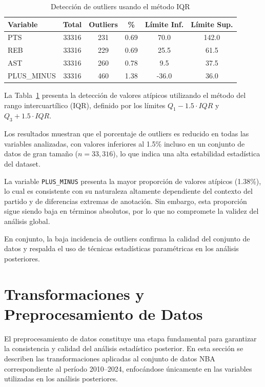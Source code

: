 \documentclass[12pt]{article}
\begin{document}
\begin{table}[H]
\centering
\caption{Detección de outliers usando el método IQR}
\label{tab:outliers_iqr}
\begin{tabular}{lccccc}
\toprule
Variable & Total & Outliers & \% & Límite Inf. & Límite Sup. \\
\midrule
PTS & 33316 & 231 & 0.69 & 70.0 & 142.0 \\
REB & 33316 & 229 & 0.69 & 25.5 & 61.5 \\
AST & 33316 & 260 & 0.78 & 9.5 & 37.5 \\
PLUS\_MINUS & 33316 & 460 & 1.38 & -36.0 & 36.0 \\
\bottomrule
\end{tabular}
\end{table}

La Tabla~\ref{tab:outliers_iqr} presenta la detección de valores atípicos utilizando el método del rango intercuartílico (IQR), definido por los límites $Q_1 - 1.5 \cdot IQR$ y $Q_3 + 1.5 \cdot IQR$.

Los resultados muestran que el porcentaje de outliers es reducido en todas las variables analizadas, con valores inferiores al 1.5\% incluso en un conjunto de datos de gran tamaño ($n = 33{,}316$), lo que indica una alta estabilidad estadística del dataset.

La variable \texttt{PLUS\_MINUS} presenta la mayor proporción de valores atípicos (1.38\%), lo cual es consistente con su naturaleza altamente dependiente del contexto del partido y de diferencias extremas de anotación. Sin embargo, esta proporción sigue siendo baja en términos absolutos, por lo que no compromete la validez del análisis global.

En conjunto, la baja incidencia de outliers confirma la calidad del conjunto de datos y respalda el uso de técnicas estadísticas paramétricas en los análisis posteriores.

\section{Transformaciones y Preprocesamiento de Datos}
\label{sec:transformaciones}

El preprocesamiento de datos constituye una etapa fundamental para garantizar la consistencia y
calidad del análisis estadístico posterior. En esta sección se describen las transformaciones
aplicadas al conjunto de datos NBA correspondiente al período 2010--2024, enfocándose únicamente
en las variables utilizadas en los análisis posteriores.
\end{document}
